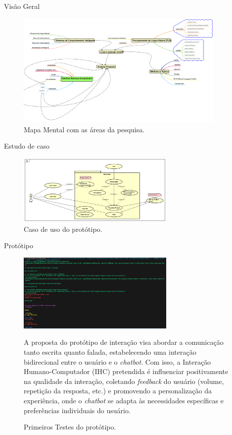\documentclass{beamer}
\begin{document}
\begin{frame}{Visão Geral}
    \begin{figure}[!h]
    \centering
    \includegraphics[width=4.0in]{images/Mapa mental.png}
    \caption{Mapa Mental com as áreas da pesquisa.} 
    \label{fig:Mapamental}
    \end{figure}
\end{frame}

\begin{frame}[allowframebreaks]{Estudo de caso}

\begin{figure}[!h]
\centering
\includegraphics[width=3in]{images/UseCase.png}
\caption{Caso de uso do protótipo.} 
\label{fig:Casodeuso}
\end{figure}

\end{frame}

\begin{frame}[allowframebreaks]{Protótipo}

\begin{figure}[!h]
\centering
\includegraphics[width=3in]{images/Prototipo test.png}
\caption{Primeiros Testes do protótipo.} 
A proposta do protótipo de interação visa abordar a comunicação tanto escrita quanto falada, estabelecendo uma interação bidirecional entre o usuário e o \textit{chatbot}. Com isso, a Interação Humano-Computador (IHC) pretendida é influenciar positivamente na qualidade da interação, coletando \textit{feedback} do usuário (volume, repetição da resposta, etc.) e promovendo a personalização da experiência, onde o \textit{chatbot} se adapta às necessidades específicas e preferências individuais do usuário.
\label{fig:Prototipo}
\end{figure}

\end{frame}
\end{document}
